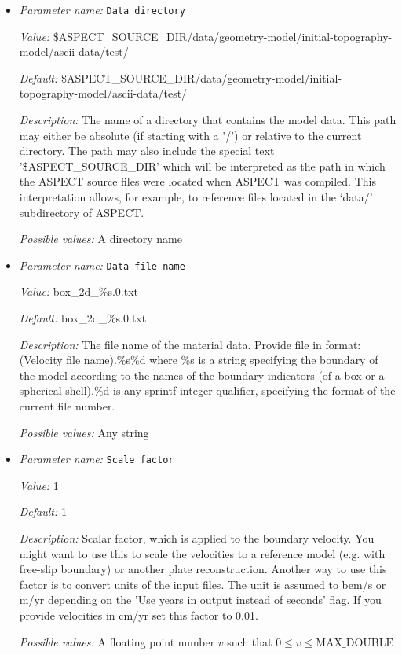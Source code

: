 \begin{itemize}
\item {\it Parameter name:} {\tt Data directory}
\label{parameters:Geometry model/Initial topography model/Ascii data model/Data directory}


{\it Value:} \$ASPECT\_SOURCE\_DIR/data/geometry-model/initial-topography-model/ascii-data/test/


{\it Default:} \$ASPECT\_SOURCE\_DIR/data/geometry-model/initial-topography-model/ascii-data/test/


{\it Description:} The name of a directory that contains the model data. This path may either be absolute (if starting with a '/') or relative to the current directory. The path may also include the special text '\$ASPECT\_SOURCE\_DIR' which will be interpreted as the path in which the ASPECT source files were located when ASPECT was compiled. This interpretation allows, for example, to reference files located in the `data/' subdirectory of ASPECT. 


{\it Possible values:} A directory name
\item {\it Parameter name:} {\tt Data file name}
\label{parameters:Geometry model/Initial topography model/Ascii data model/Data file name}


{\it Value:} box\_2d\_\%s.0.txt


{\it Default:} box\_2d\_\%s.0.txt


{\it Description:} The file name of the material data. Provide file in format: (Velocity file name).\%s\%d where \%s is a string specifying the boundary of the model according to the names of the boundary indicators (of a box or a spherical shell).\%d is any sprintf integer qualifier, specifying the format of the current file number. 


{\it Possible values:} Any string
\item {\it Parameter name:} {\tt Scale factor}
\label{parameters:Geometry model/Initial topography model/Ascii data model/Scale factor}


{\it Value:} 1


{\it Default:} 1


{\it Description:} Scalar factor, which is applied to the boundary velocity. You might want to use this to scale the velocities to a reference model (e.g. with free-slip boundary) or another plate reconstruction. Another way to use this factor is to convert units of the input files. The unit is assumed to bem/s or m/yr depending on the 'Use years in output instead of seconds' flag. If you provide velocities in cm/yr set this factor to 0.01.


{\it Possible values:} A floating point number $v$ such that $0 \leq v \leq \text{MAX\_DOUBLE}$
\end{itemize}

